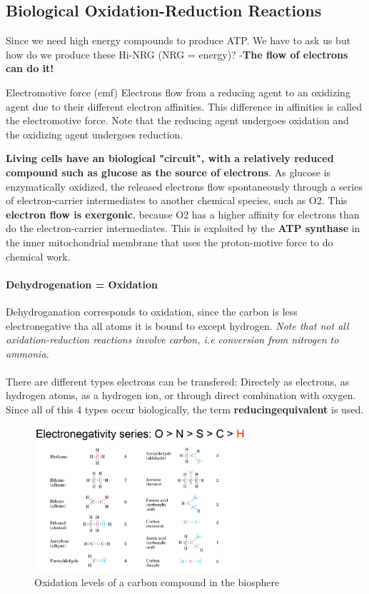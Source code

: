 \documentclass[../main.tex]{subfiles}
\begin{document}
\subsection{Biological Oxidation-Reduction Reactions}
Since we need high energy compounds to produce ATP. We have to ask us but how do we produce these Hi-NRG (NRG = energy)? -\textbf{The flow of electrons can do it!} 
\begin{DefWithTitle}{Electromotive force (emf)}
	Electrons flow from a reducing agent to an oxidizing agent due to their different electron affinities. This difference in affinities is called the electromotive force. Note that the reducing agent undergoes oxidation and the oxidizing agent undergoes reduction. 
\end{DefWithTitle}
\textbf{Living cells have an biological "circuit", with a relatively reduced compound such as glucose as the source of electrons}. As glucose is enzymatically oxidized, the released electrons flow spontaneously through a series of electron-carrier intermediates to another chemical species, such as O2. This \textbf{electron flow is exergonic}, because O2 has a higher affinity for electrons than do the electron-carrier intermediates. This is exploited by the \textbf{ATP synthase} in the inner mitochondrial membrane that uses the proton-motive force to do chemical work. 

\paragraph{Dehydrogenation = Oxidation}
Dehydroganation corresponds to oxidation, since the carbon is less electronegative tha all atoms it is bound to except hydrogen. \textit{Note that not all oxidation-reduction reactions involve carbon, i.e conversion from nitrogen to ammonia.}\\
\\
There are different types electrons can be transfered: Directely as electrons, as hydrogen atoms, as a hydrogen ion, or through direct combination with oxygen. Since all of this 4 types occur biologically, the term \textbf{\gls{reducingequivalent}} is used.
 
\begin{figure}[H]
	\centering
	\includegraphics[width=0.7\textwidth]{reduction}
	\caption{Oxidation levels of a carbon compound in the biosphere}
\end{figure}
\end{document}
